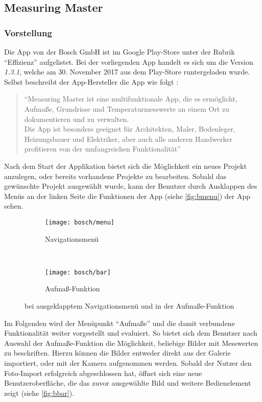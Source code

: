 \subsection{Measuring Master}
\subsubsection{Vorstellung}
Die App \mm{} von der Bosch GmbH ist im Google Play-Store unter der Rubrik ``Effizienz'' aufgelistet.
Bei der vorliegenden App handelt es sich um die Version \emph{1.3.1}, welche am 30. November 2017 aus dem Play-Store runtergeladen wurde.
Selbst beschreibt der App-Hersteller die App wie folgt \citep{BoschMM}:

\begin{quote}
  ``Measuring Master ist eine multifunktionale App, die es ermöglicht, Aufmaße, Grundrisse und Temperaturmesswerte an einem Ort zu dokumentieren und zu verwalten.\\
  Die App ist besonders geeignet für Architekten, Maler, Bodenleger, Heizungsbauer und Elektriker, aber auch alle anderen Handwerker profitieren von der umfangreichen Funktionalität''
\end{quote}

\noindent
Nach dem Start der Applikation bietet sich die Möglichkeit ein neues Projekt anzulegen, oder bereits vorhandene Projekte zu bearbeiten.
Sobald das gewünschte Projekt ausgewählt wurde, kann der Benutzer durch Ausklappen des Menüs an der linken Seite die Funktionen der App (siehe \autoref{fig:bmenu}) der App sehen. \\

\begin{figure}[h]
  \begin{subfigure}[t]{0.45\textwidth}
    \centering
    \texttt{[image: bosch/menu]}
    \caption{Navigationsmenü}\label{fig:bmenu}	
  \end{subfigure}
  ~
  \begin{subfigure}[t]{0.45\textwidth}
    \centering
    \texttt{[image: bosch/bar]}
    \caption{Aufmaß-Funktion}\label{fig:bbar}
  \end{subfigure}
  \centering
  \caption{\mm{} bei ausgeklapptem Navigationsmenü und in der Aufmaße-Funktion}
\end{figure}

Im Folgenden wird der Menüpunkt ``Aufmaße'' und die damit verbundene Funktionalität weiter vorgestellt und evaluiert.
So bietet sich dem Benutzer nach Auswahl der Aufmaße-Funktion die Möglichkeit, beliebige Bilder mit Messwerten zu beschriften.
Hierzu können die Bilder entweder direkt aus der Galerie importiert, oder mit der Kamera aufgenommen werden.
Sobald der Nutzer den Foto-Import erfolgreich abgeschlossen hat, öffnet sich eine neue Benutzeroberfläche, die das zuvor ausgewählte Bild und weitere Bedienelement zeigt (siehe \autoref{fig:bbar}). \\

